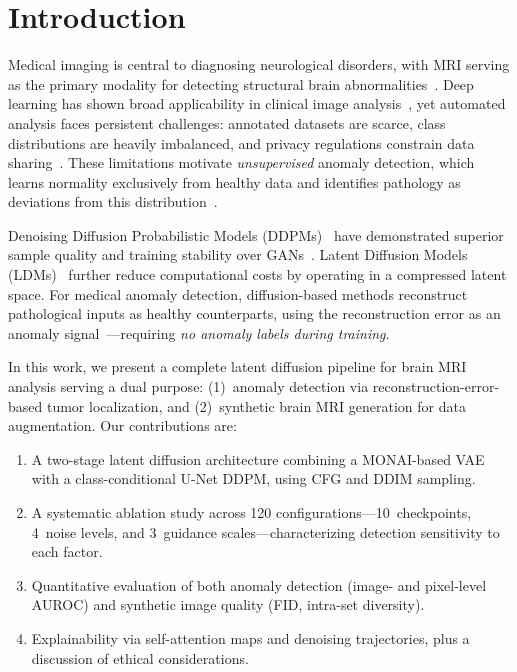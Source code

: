\documentclass[graybox]{svmult}
\begin{document}
\section{Introduction}
\label{sec:introduction}

Medical imaging is central to diagnosing neurological disorders, with MRI serving as the primary modality for detecting structural brain abnormalities~\cite{baur2021autoencoders}. Deep learning has shown broad applicability in clinical image analysis~\cite{amerikanos2022image}, yet automated analysis faces persistent challenges: annotated datasets are scarce, class distributions are heavily imbalanced, and privacy regulations constrain data sharing~\cite{yi2019generative}. These limitations motivate \textit{unsupervised} anomaly detection, which learns normality exclusively from healthy data and identifies pathology as deviations from this distribution~\cite{baur2021autoencoders, schlegl2019f}.

Denoising Diffusion Probabilistic Models (DDPMs)~\cite{ho2020denoising} have demonstrated superior sample quality and training stability over GANs~\cite{goodfellow2014generative, dhariwal2021diffusion}. Latent Diffusion Models (LDMs)~\cite{rombach2022high} further reduce computational costs by operating in a compressed latent space. For medical anomaly detection, diffusion-based methods reconstruct pathological inputs as healthy counterparts, using the reconstruction error as an anomaly signal~\cite{wyatt2022anoddpm, wolleb2022diffusion, sanchez2022healthy}---requiring \textit{no anomaly labels during training}.

In this work, we present a complete latent diffusion pipeline for brain MRI analysis serving a dual purpose: (1)~anomaly detection via reconstruction-error-based tumor localization, and (2)~synthetic brain MRI generation for data augmentation. Our contributions are:

\begin{enumerate}
  \item A two-stage latent diffusion architecture combining a MONAI-based VAE with a class-conditional U-Net DDPM, using CFG and DDIM sampling.
  \item A systematic ablation study across 120 configurations---10~checkpoints, 4~noise levels, and 3~guidance scales---characterizing detection sensitivity to each factor.
  \item Quantitative evaluation of both anomaly detection (image- and pixel-level AUROC) and synthetic image quality (FID, intra-set diversity).
  \item Explainability via self-attention maps and denoising trajectories, plus a discussion of ethical considerations.
\end{enumerate}
\end{document}
